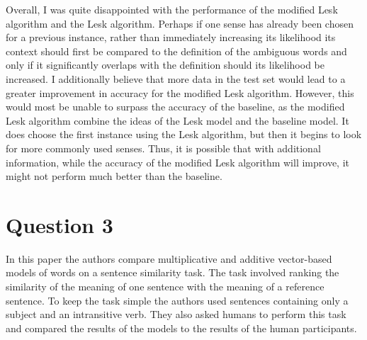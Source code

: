 \documentclass{article}
\begin{document}
Overall, I was quite disappointed with the performance of the modified Lesk algorithm and the Lesk algorithm.  Perhaps if one sense has already been chosen for a previous instance, rather than immediately increasing its likelihood its context should first be compared to the definition of the ambiguous words and only if it significantly overlaps with the definition should its likelihood be increased.  I additionally believe that more data in the test set would lead to a greater improvement in accuracy for the modified Lesk algorithm.  However, this would most be unable to surpass the accuracy of the baseline, as the modified Lesk algorithm combine the ideas of the Lesk model and the baseline model.  It does choose the first instance using the Lesk algorithm, but then it begins to look for more commonly used senses.  Thus, it is possible that with additional information, while the accuracy of the modified Lesk algorithm will improve, it might not perform much better than the baseline.

\section*{Question 3}
In this paper the authors compare multiplicative and additive vector-based models of words on a sentence similarity task.  The task involved ranking the similarity of the meaning of one sentence with the meaning of a reference sentence.  To keep the task simple the authors used sentences containing only a subject and an intransitive verb.  They also asked humans to perform this task and compared the results of the models to the results of the human participants.  
\end{document}
